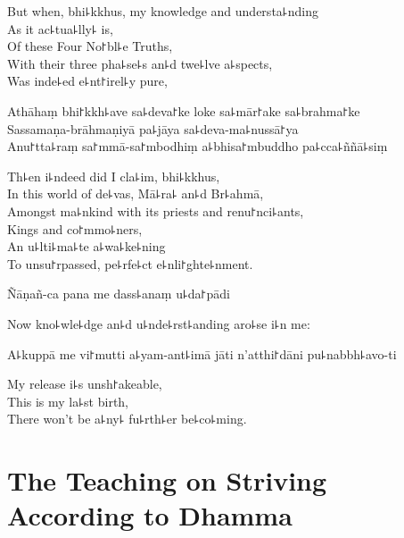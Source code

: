 \begin{english}
  But when, bhi꜕kkhus, my knowledge and understa꜕nding\\
  As it ac꜕tua꜕lly꜕ is,\\
  Of these Four No꜓bl꜕e Truths,\\
  With their three pha꜕se꜕s an꜕d twe꜕lve a꜕spects,\\
  Was inde꜕ed e꜕nt꜓irel꜕y pure,
\end{english}

Athāhaṃ bhi꜓kkh꜕ave sa꜕deva꜓ke loke sa꜕mār꜓ake sa꜕brahma꜓ke\\
Sassamaṇa-brāhmaṇiyā pa꜕jāya sa꜕deva-ma꜕nussā꜓ya\\
Anu꜓tta꜕raṃ sa꜓mmā-sa꜓mbodhiṃ a꜕bhisa꜓mbuddho pa꜕cca꜕ññā꜕siṃ

\begin{english}
  Th꜕en i꜕ndeed did I cla꜕im, bhi꜕kkhus,\\
  In this world of de꜕vas, Mā꜕ra꜕ an꜕d Br꜕ahmā,\\
  Amongst ma꜕nkind with its priests and renu꜓nci꜕ants,\\
  Kings and co꜓mmo꜕ners,\\
  An u꜕lti꜕ma꜕te a꜕wa꜕ke꜕ning\\
  To unsu꜓rpassed, pe꜕rfe꜕ct e꜕nli꜓ghte꜕nment.
\end{english}

Ñāṇañ-ca pana me dass꜕anaṃ u꜕da꜓pādi

\begin{english}
  Now kno꜕wle꜕dge an꜕d u꜕nde꜕rst꜕anding aro꜕se i꜕n me:
\end{english}

A꜕kuppā me vi꜓mutti a꜕yam-ant꜕imā jāti n'atthi꜓dāni pu꜕nabbh꜕avo-ti

\begin{english}
  My release i꜕s unsh꜓akeable,\\
  This is my la꜕st birth,\\
  There won't be a꜕ny꜕ fu꜕rth꜕er be꜕co꜕ming.
\end{english}

\chapter[Striving According to Dhamma]{The Teaching on Striving According to Dhamma}%

\begin{leader}
\end{leader}


